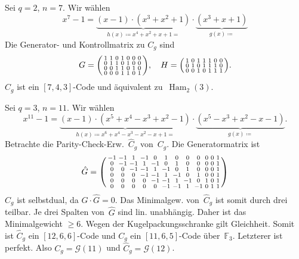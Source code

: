 \documentclass{cheat-sheet}
\newcommand{\F}{\mathbb{F}} %
\DeclareMathOperator{\Ham}{Ham} %
\newcommand{\Golay}{\mathcal{G}} %
\begin{document}
\begin{bsp}
  Sei $q=2$, $n=7$.
  Wir wählen
  \[
    x^7 - 1 = \underbrace{(x-1) \cdot (x^3 + x^2 + 1)}_{h(x) \coloneqq x^4 + x^2 + x + 1 =} \cdot \underbrace{(x^3 + x + 1)}_{g(x) \coloneqq}
  \]
  Die Generator- und Kontrollmatrix zu $C_g$ sind
  \[
    G = \begin{psmallmatrix}
      1 & 1 & 0 & 1 & 0 & 0 & 0 \\
      0 & 1 & 1 & 0 & 1 & 0 & 0 \\
      0 & 0 & 1 & 1 & 0 & 1 & 0 \\
      0 & 0 & 0 & 1 & 1 & 0 & 1
    \end{psmallmatrix}, \quad
    H = \begin{psmallmatrix}
      1 & 0 & 1 & 1 & 1 & 0 & 0 \\
      0 & 1 & 0 & 1 & 1 & 1 & 0 \\
      0 & 0 & 1 & 0 & 1 & 1 & 1
    \end{psmallmatrix}.
  \]
  $C_g$ ist ein $[7, 4, 3]$-Code und äquivalent zu~$\Ham_2(3)$.
\end{bsp}

\begin{bsp}
  Sei $q = 3$, $n = 11$.
  Wir wählen
  \[
    x^{11} - 1 = \underbrace{(x-1) \cdot (x^5 + x^4 - x^3 + x^2 - 1)}_{h(x) \coloneqq x^6 + x^4 - x^3 - x^2 - x + 1 =} \cdot \underbrace{(x^5 - x^3 + x^2 - x - 1)}_{g(x) \coloneqq}.
  \]
  Betrachte die Parity-Check-Erw.~$\hat{C}_g$ von~$C_g$.
  Die Generatormatrix ist
  \[
    \setcounter{MaxMatrixCols}{20} %
    \hat{G} = \begin{psmallmatrix}
      -1 & -1 & 1 & -1 & 0 & 1 & 0 & 0 & 0 & 0 & 0 & 1 \\
      0 & -1 & -1 & 1 & -1 & 0 & 1 & 0 & 0 & 0 & 0 & 1 \\
      0 & 0 & -1 & -1 & 1 & -1 & 0 & 1 & 0 & 0 & 0 & 1 \\
      0 & 0 & 0 & -1 & -1 & 1 & -1 & 0 & 1 & 0 & 0 & 1 \\
      0 & 0 & 0 & 0 & -1 & -1 & 1 & -1 & 0 & 1 & 0 & 1 \\
      0 & 0 & 0 & 0 & 0 & -1 & -1 & 1 & -1 & 0 & 1 & 1
    \end{psmallmatrix}
  \]
  $\hat{C}_g$ ist selbstdual, da $\hat{G} \cdot \hat{G} = 0$.
  Das Minimalgew. von~$\hat{C}_g$ ist somit durch drei teilbar.
  Je drei Spalten von~$\hat{G}$ sind lin. unabhängig.
  Daher ist das Minimalgewicht $\geq 6$.
  Wegen der Kugelpackungsschranke gilt Gleichheit.
  Somit ist $\hat{C}_g$ ein $[12, 6, 6]$-Code und $C_g$ ein $[11, 6, 5]$-Code über~$\F_3$.
  Letzterer ist perfekt.
  Also $C_g = \Golay(11)$ und $\hat{C}_g = \Golay(12)$.
\end{bsp}
\end{document}
